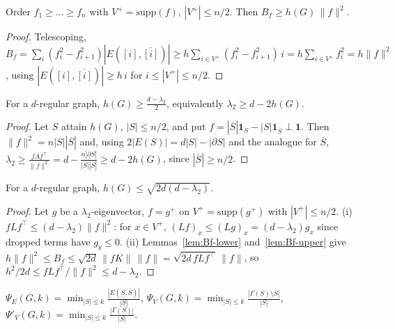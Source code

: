 \begin{lemma}
  \label{lem:Bf-lower}
  Order $f_1\ge\dots\ge f_n$ with $V^+=\mathrm{supp}(f)$, $|V^+|\le n/2$. Then
  $B_f\ge h(G)\,\|f\|^2$.
\end{lemma}
\begin{proof}
  Telescoping, $B_f=\sum_{i}(f_i^2-f_{i+1}^2)|E([i],\overline{[i]})|
  \ge h\sum_{i\in V^+}(f_i^2-f_{i+1}^2)\,i=h\sum_{i\in V^+}f_i^2=h\|f\|^2$, using
  $|E([i],\overline{[i]})|\ge h\,i$ for $i\le|V^+|\le n/2$.
\end{proof}

\begin{theorem}
  \label{thm:cheeger-easy}
  For a $d$-regular graph, $h(G)\ge\tfrac{d-\lambda_2}2$, equivalently
  $\lambda_2\ge d-2h(G)$.
\end{theorem}
\begin{proof}
  Let $S$ attain $h(G)$, $|S|\le n/2$, and put
  $f=|\overline S|\mathbf 1_S-|S|\mathbf 1_{\overline S}\perp\mathbf 1$. Then
  $\|f\|^2=n|S||\overline S|$ and, using $2|E(S)|=d|S|-|\partial S|$ and the
  analogue for $\overline S$,
  $\lambda_2\ge\frac{fAf^\top}{\|f\|^2}=d-\frac{n|\partial S|}{|S||\overline S|}
  \ge d-2h(G)$, since $|\overline S|\ge n/2$.
\end{proof}

\begin{theorem}
  \label{thm:cheeger-hard}
  For a $d$-regular graph, $h(G)\le\sqrt{2d(d-\lambda_2)}$.
\end{theorem}
\begin{proof}
  Let $g$ be a $\lambda_2$-eigenvector, $f=g^+$ on $V^+=\mathrm{supp}(g^+)$ with
  $|V^+|\le n/2$. (i) $fLf^\top\le(d-\lambda_2)\|f\|^2$: for $x\in V^+$,
  $(Lf)_x\le(Lg)_x=(d-\lambda_2)g_x$ since dropped terms have $g_y\le0$. (ii)
  Lemmas~\ref{lem:Bf-lower} and~\ref{lem:Bf-upper} give
  $h\|f\|^2\le B_f\le\sqrt{2d}\,\|fK\|\,\|f\|=\sqrt{2d\,fLf^\top}\,\|f\|$, so
  $h^2/2d\le fLf^\top/\|f\|^2\le d-\lambda_2$.
\end{proof}

\begin{definition}
  \label{def:small-set-expansion}
  $\Psi_E(G,k)=\min_{|S|\le k}\frac{|E(S,\overline S)|}{|S|}$,
  $\Psi_V(G,k)=\min_{|S|\le k}\frac{|\Gamma(S)\setminus S|}{|S|}$,
  $\Psi'_V(G,k)=\min_{|S|\le k}\frac{|\Gamma(S)|}{|S|}$.
\end{definition}

